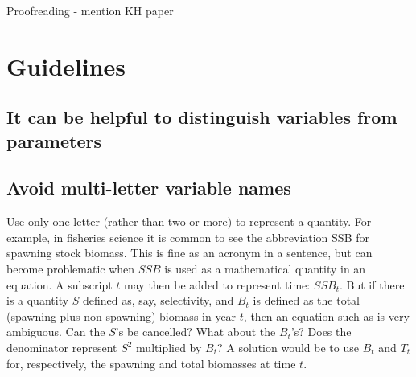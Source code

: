 
\begin{frame}
\frametitle{}
\bi
  \item
\ei
\end{frame}


\begin{frame}
\frametitle{}
\bi
  \item
\ei
\end{frame}


\begin{frame}
\frametitle{}
\bi
  \item
\ei
\end{frame}







Proofreading - mention KH paper





\section*{Guidelines}






\subsection*{It can be helpful to distinguish variables from parameters}


\subsection*{Avoid multi-letter variable names}

Use only one letter (rather than two or more) to represent a quantity.
For example, in fisheries science
it is common to see the abbreviation SSB for spawning stock biomass.
This is fine as an acronym in a sentence, but can become problematic when
$SSB$ is used as a mathematical quantity in an equation. A subscript $t$
may then be added to represent time: $SSB_t$. But if there is a
quantity
$S$ defined as, say, selectivity, and $B_t$ is defined as the total (spawning
plus non-spawning) biomass in year $t$, then an equation such as
\eb
{}
\label{SSB}
\ee
is very ambiguous. Can the $S$'s be cancelled? What about the $B_t$'s? Does
the denominator represent $S^2$ multiplied by $B_t$? A solution would be to use
$B_t$ and $T_t$ for, respectively, the spawning and
total biomasses at time $t$.

